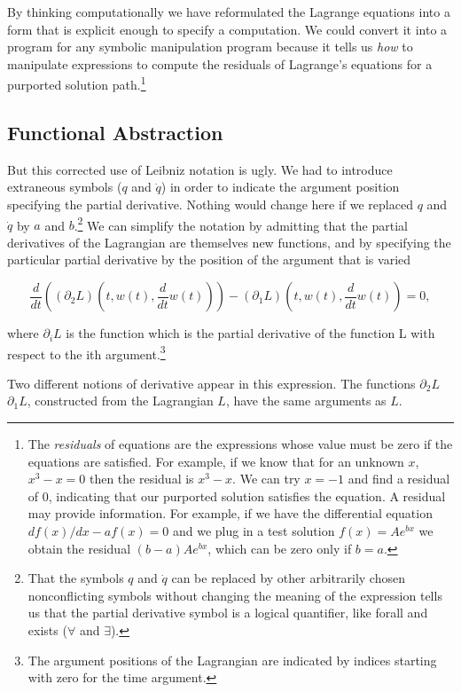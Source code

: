 \documentclass[11pt]{article}
\begin{document}
By thinking computationally we have reformulated the Lagrange equations into a
form that is explicit enough to specify a computation. We could convert it into
a program for any symbolic manipulation program because it tells us \emph{how} to
manipulate expressions to compute the residuals of Lagrange’s equations for a
purported solution path.\footnote{The \emph{residuals} of equations are the expressions whose value must be zero
if the equations are satisfied. For example, if we know that for an unknown \(x\),
\(x^3-x=0\) then the residual is \(x^3 - x\). We can try \(x = -1\) and find a
residual of 0, indicating that our purported solution satisfies the equation. A
residual may provide information. For example, if we have the differential
equation \(df(x)/dx - af(x) = 0\) and we plug in a test solution \(f(x) = Ae^{bx}\)
we obtain the residual \((b - a)Ae^{bx}\), which can be zero only if \(b = a\).}

\subsection{Functional Abstraction}
\label{sec:orgacf6e72}

But this corrected use of Leibniz notation is ugly. We had to introduce
extraneous symbols (\(q\) and \(\dot{q}\)) in order to indicate the argument
position specifying the partial derivative. Nothing would change here if we
replaced \(q\) and \(\dot{q}\) by \(a\) and \(b\).\footnote{That the symbols \(q\) and \(\dot{q}\) can be replaced by other arbitrarily
chosen nonconflicting symbols without changing the meaning of the expression
tells us that the partial derivative symbol is a logical quantifier, like forall
and exists (\(\forall\) and \(\exists\)).} We can simplify the notation by
admitting that the partial derivatives of the Lagrangian are themselves new
functions, and by specifying the particular partial derivative by the position
of the argument that is varied

$$\frac{d}{d t}\left(\left(\partial_{2} L\right)\left(t, w(t), \frac{d}{d t}
w(t)\right)\right)-\left(\partial_{1} L\right)\left(t, w(t), \frac{d}{d t}
w(t)\right)=0,$$

where \(\partial_{i}L\) is the function which is the partial derivative of the
function L with respect to the ith argument.\footnote{The argument positions of the Lagrangian are indicated by indices
starting with zero for the time argument.}

Two different notions of derivative appear in this expression. The functions
\(\partial_2 L\) \(\partial_1 L\), constructed from the Lagrangian \(L\), have the
same arguments as \(L\).
\end{document}
